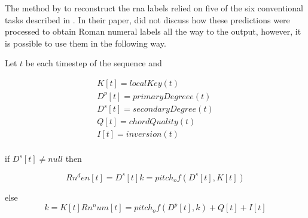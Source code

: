 
The method by \textcite{chen2018functional} to reconstruct
the \gls{rna} labels relied on five of the six conventional
tasks described in . In their
paper, \textcite{chen2018functional} did not discuss how
these predictions were processed to obtain Roman numeral
labels all the way to the output, however, it is possible to
use them in the following way.

Let $t$ be each timestep of the sequence and

\begin{equation}
\begin{split}
K[t] = localKey(t) \\
D^p[t] = primaryDegree e(t) \\
D^s[t] = secondaryDegree(t)  \\
Q[t] = chordQuality(t) \\
I[t] = inversion(t) \\
\end{split}
\end{equation}

if $D^s[t] \neq null$ then

\begin{equation}
Rn^den[t] = D^s[t]
k = pitch_of(D^s[t], K[t])
\end{equation}

else
\begin{equation}
k = K[t]
Rn^num[t] = pitch_of(D^p[t], k) + Q[t] + I[t] 
\end{equation}
